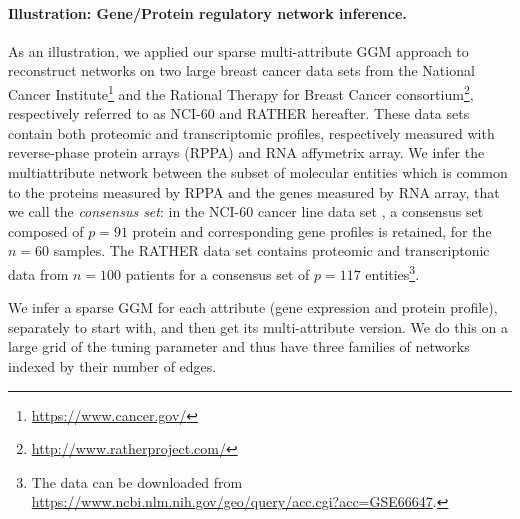 \paragraph*{Illustration: Gene/Protein regulatory network inference.}

As an illustration, we applied our sparse multi-attribute GGM approach
to reconstruct networks on two large breast cancer data sets from the
National Cancer Institute\footnote{\url{https://www.cancer.gov/}} and
the Rational Therapy for Breast Cancer
consortium\footnote{\url{http://www.ratherproject.com/}}, respectively
referred to as NCI-60 and RATHER hereafter. These data sets contain
both proteomic and transcriptomic profiles, respectively measured with
reverse-phase protein arrays (RPPA) and RNA affymetrix array. We infer
the multiattribute network between the subset of molecular entities
which is common to the proteins measured by RPPA and the genes
measured by RNA array, that we call the \textit{consensus set}: in the
NCI-60 cancer line data set \citep{pfister2009topoisomerase}, a
consensus set composed of $p=91$ protein and corresponding gene
profiles is retained, for the $n=60$ samples. The RATHER data set
\citep{michaut2016integration} contains proteomic and transcriptonic
data from $n=100$ patients for a consensus set of $p=117$
entities\footnote{The data can be downloaded from
  \url{https://www.ncbi.nlm.nih.gov/geo/query/acc.cgi?acc=GSE66647}.}.

We infer a sparse GGM for each attribute (gene expression and protein
profile), separately to start with, and then get its multi-attribute
version.  We do this on a large grid of the tuning parameter and thus
have three families of networks indexed by their number of edges.

